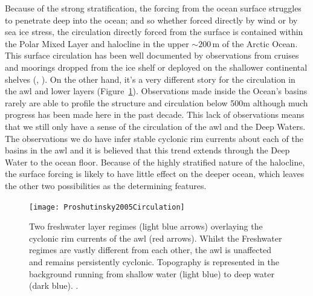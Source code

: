\documentclass[10pt,a4paper]{article}
\newcommand*\figref[1]{Figure~\ref{#1}}
\begin{document}
Because of the strong stratification, the forcing from the ocean surface 
struggles to penetrate deep into the ocean; and so whether forced directly by wind 
or by sea ice stress, the circulation
directly forced from the surface is contained within the Polar Mixed Layer 
and halocline in the upper ${\sim}200\,\mathrm{m}$ of the Arctic Ocean. 
This surface circulation has been well documented by observations
from cruises and moorings  dropped  from  the  ice  shelf  or  deployed  on 
the  shallower  continental  shelves (\cite{gerdes1997large}, \cite{jones2001circulation}). On the other hand, it's a very different
story for the circulation in the \gls{awl} and lower layers (\figref{fig:Proshutinsky2005Circulation}). Observations made
inside the Ocean's basins rarely are able to profile the structure  and
circulation  below 500m  although much progress has been made here in the
past decade. This lack of observations means that  we  still only have  a  sense  of  the circulation 
of the \gls{awl} and the Deep  Waters.  The  observations  we  do 
have  infer stable cyclonic  rim  currents about each of the basins in the
\gls{awl} and it is believed that this trend extends through the Deep Water to the 
ocean floor.  Because of the highly stratified nature of the halocline, the surface forcing 
is likely to have little effect on the deeper ocean, which leaves the other 
two possibilities as the determining features.


\begin{figure}
	\centering
	\texttt{[image: Proshutinsky2005Circulation]}
	\caption[\cite{proshutinsky2005arctic}]{ Two freshwater layer regimes (light 
		blue arrows) overlaying the cyclonic rim currents of the \gls{awl} (red arrows).
		Whilst the Freshwater regimes are vastly different from each other, the
		\gls{awl} is unaffected and remains persistently cyclonic.
		Topography is represented in the background running from 
		shallow water (light blue) to deep water (dark blue).  \cite{proshutinsky2005arctic}.}
	\label{fig:Proshutinsky2005Circulation}
\end{figure}
\end{document}
